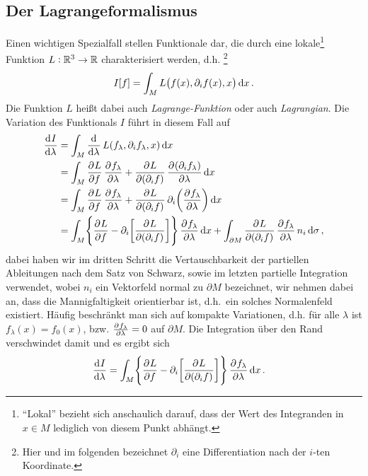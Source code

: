 \subsection{Der Lagrangeformalismus}
Einen wichtigen Spezialfall stellen Funktionale dar, die durch eine
lokale\footnote{"`Lokal"' bezieht sich anschaulich darauf, dass der Wert des
Integranden in $x\in M$ lediglich von diesem Punkt abhängt.} Funktion
${L:\mathbb{R}^3\to \mathbb{R}}$ charakterisiert werden, d.h. \footnote{Hier
und im folgenden bezeichnet $\partial_i$ eine Differentiation nach der $i$-ten
Koordinate.}
\begin{equation}
I[f]=\int_M L\left(f(x),\partial_i f(x),x\right)\dif x\,.
\end{equation}
Die Funktion $L$ heißt dabei auch \emph{Lagrange-Funktion} oder auch
\emph{Lagrangian}.
Die Variation des Funktionals $I$ führt in diesem Fall auf
\begin{equation}
\begin{split}
\dod{I}{\lambda}
&=\int_M\dod{}{\lambda}L(f_\lambda,\partial_i
f_\lambda,x)\dif x\\
&=\int_M\dpd{L}{ f}\dpd{ f_\lambda}{\lambda}
+\dpd{L}{(\partial_i f)}\dpd{(\partial_i f_\lambda)}{\lambda}\dif x\\
&=\int_M\dpd{L}{ f}\dpd{ f_\lambda}{\lambda}
+\dpd{L}{(\partial_i f)}\partial_i\left(\dpd{
f_\lambda}{\lambda}\right)\dif x\\
&=\int_M\left\{\dpd{L}{ f}
-\partial_i\left[\dpd{L}{(\partial_i f)}\right]\right\}\dpd{
f_\lambda}{\lambda}\dif x +\int_{\partial
M}\dpd{L}{(\partial_i f)}\dpd{
f_\lambda}{\lambda}n_i\dif\sigma\,,
\end{split}
\end{equation}
dabei haben wir im dritten Schritt die Vertauschbarkeit
der partiellen Ableitungen nach dem Satz von Schwarz, sowie im letzten
partielle Integration verwendet, wobei $n_i$ ein Vektorfeld normal zu $\partial M$
bezeichnet, wir nehmen dabei an, dass die Mannigfaltigkeit orientierbar ist,
d.h.\ ein solches Normalenfeld existiert.
Häufig beschränkt man sich auf kompakte Variationen, d.h. für alle $\lambda$ ist
$f_\lambda(x)=f_0(x)$, bzw. $\pd{ f_\lambda}{\lambda}=0$ auf $\partial M$. Die
Integration über den Rand verschwindet damit und es ergibt sich
\begin{equation}
\begin{split}
\dod{I}{\lambda}
&=\int_M\left\{\dpd{L}{ f}
-\partial_i\left[\dpd{L}{(\partial_i f)}\right]\right\}\dpd{
f_\lambda}{\lambda}\dif x\,.
\end{split}
\end{equation}
